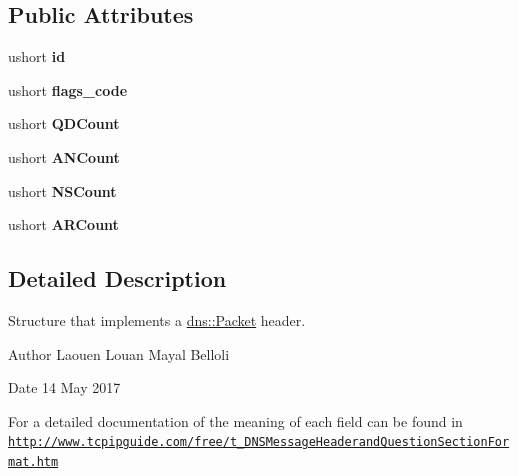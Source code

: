 \subsection*{Public Attributes}
\begin{DoxyCompactItemize}
\item 
ushort {\bfseries id}\hypertarget{structdns_1_1Header_a93db6477169afa0916eb97e18d0d414d}{}\label{structdns_1_1Header_a93db6477169afa0916eb97e18d0d414d}

\item 
ushort {\bfseries flags\+\_\+code}\hypertarget{structdns_1_1Header_afd9a0c9f79092a0baa8ad67d8f8cfcf5}{}\label{structdns_1_1Header_afd9a0c9f79092a0baa8ad67d8f8cfcf5}

\item 
ushort {\bfseries Q\+D\+Count}\hypertarget{structdns_1_1Header_ac4606baefe48fdda25fe00693426cac6}{}\label{structdns_1_1Header_ac4606baefe48fdda25fe00693426cac6}

\item 
ushort {\bfseries A\+N\+Count}\hypertarget{structdns_1_1Header_a47cd880532a4aaad40e32c2c2b10bf83}{}\label{structdns_1_1Header_a47cd880532a4aaad40e32c2c2b10bf83}

\item 
ushort {\bfseries N\+S\+Count}\hypertarget{structdns_1_1Header_ace802bcf38b0de507788d7fb5f4ca082}{}\label{structdns_1_1Header_ace802bcf38b0de507788d7fb5f4ca082}

\item 
ushort {\bfseries A\+R\+Count}\hypertarget{structdns_1_1Header_a7a209945d4c1fa015a4ecbfe618f11e5}{}\label{structdns_1_1Header_a7a209945d4c1fa015a4ecbfe618f11e5}

\end{DoxyCompactItemize}


\subsection{Detailed Description}
Structure that implements a \hyperlink{structdns_1_1Packet}{dns\+::\+Packet} header. 

\begin{DoxyAuthor}{Author}
Laouen Louan Mayal Belloli 
\end{DoxyAuthor}
\begin{DoxyDate}{Date}
14 May 2017
\end{DoxyDate}
For a detailed documentation of the meaning of each field can be found in \href{http://www.tcpipguide.com/free/t_DNSMessageHeaderandQuestionSectionFormat.htm}{\tt http\+://www.\+tcpipguide.\+com/free/t\+\_\+\+D\+N\+S\+Message\+Headerand\+Question\+Section\+Format.\+htm} 

